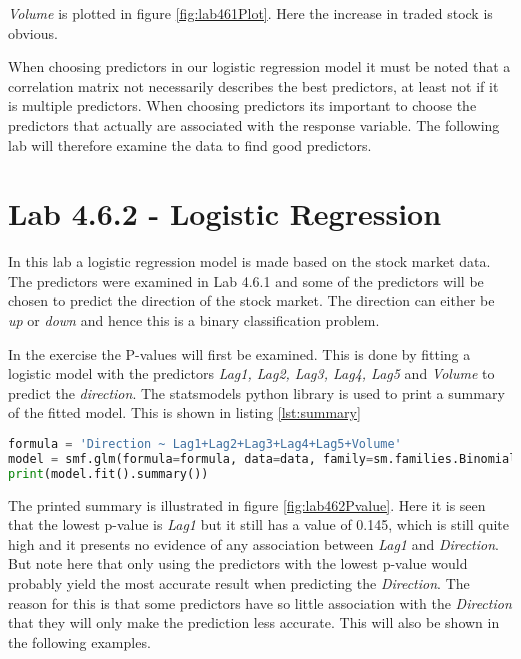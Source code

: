 \FloatBarrier

\emph{Volume} is plotted in figure \ref{fig:lab461Plot}. Here the increase in traded stock is obvious.


When choosing predictors in our logistic regression model it must be noted that a correlation matrix not necessarily describes the best predictors, at least not if it is multiple predictors. When choosing predictors its important to choose the predictors that actually are associated with the response variable. The following lab will therefore examine the data to find good predictors.

\section{Lab 4.6.2 - Logistic Regression}
\label{sec:lab462}
In this lab a logistic regression model is made based on the stock market data. The predictors were examined in Lab 4.6.1 and some of the predictors will be chosen to predict the direction of the stock market. The direction can either be \emph{up} or \emph{down} and hence this is a binary classification problem.

In the exercise the P-values will first be examined. This is done by fitting a logistic model with the predictors \emph{Lag1, Lag2, Lag3, Lag4, Lag5} and \emph{Volume} to predict the \emph{direction}. The statsmodels python library is used to print a summary of the fitted model. This is shown in listing \ref{lst:summary}
\begin{lstlisting}[language=Python, label=lst:summary, caption=Print summary]
formula = 'Direction ~ Lag1+Lag2+Lag3+Lag4+Lag5+Volume'
model = smf.glm(formula=formula, data=data, family=sm.families.Binomial())
print(model.fit().summary())
\end{lstlisting}

\FloatBarrier

The printed summary is illustrated in figure \ref{fig:lab462Pvalue}. Here it is  seen that the lowest p-value is \emph{Lag1} but it still has a value of 0.145, which is still quite high and it presents no evidence of any association between \emph{Lag1} and \emph{Direction}. But note here that only using the predictors with the lowest p-value would probably yield the most accurate result when predicting the \emph{Direction}. The reason for this is that some predictors have so little association with the \emph{Direction} that they will only make the prediction less accurate. This will also be shown in the following examples.


